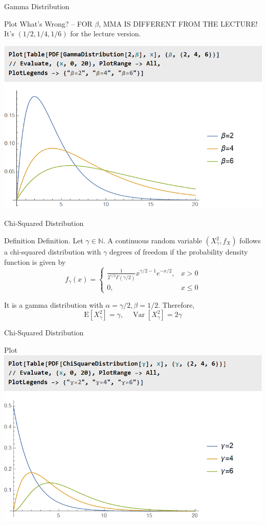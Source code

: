 \documentclass{beamer}
\begin{document}
\begin{frame}{Gamma Distribution}
\begin{block}{Plot}
What's Wrong?
-- FOR $\beta$, MMA IS DIFFERENT FROM THE LECTURE! It's $(1/2,1/4,1/6)$ for the lecture version.

\includegraphics[scale=0.5]{gamma2.png}
\end{block}
\end{frame}

\begin{frame}{Chi-Squared Distribution}
\begin{block}{Definition}
Definition. Let $\gamma \in \mathbb{N}$. A continuous random variable $\left(X_{\gamma}^{2}, f_{X}\right)$ follows a chi-squared distribution with $\gamma$ degrees of freedom if the probability density function is given by
$$
f_{\gamma}(x)= \begin{cases}\frac{1}{2^{\gamma / 2} \Gamma(\gamma / 2)} x^{\gamma / 2-1} e^{-x / 2}, & x>0 \\ 0, & x \leq 0\end{cases}
$$
\end{block}
It is a gamma distribution with $\alpha=\gamma / 2, \beta=1 / 2$. Therefore,
$$
\mathrm{E}\left[X_{\gamma}^{2}\right]=\gamma, \quad \operatorname{Var}\left[X_{\gamma}^{2}\right]=2 \gamma
$$
\end{frame}

\begin{frame}{Chi-Squared Distribution}
\begin{block}{Plot}
\includegraphics[scale=0.5]{chi.png}
\end{block}
\end{frame}
\end{document}
